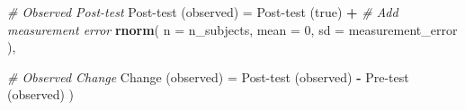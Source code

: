 \documentclass[
]{book}
\newenvironment{Shaded}{\begin{snugshade}}{\end{snugshade}}
\newcommand{\CommentTok}[1]{\textcolor[rgb]{0.56,0.35,0.01}{\textit{#1}}}
\newcommand{\DataTypeTok}[1]{\textcolor[rgb]{0.13,0.29,0.53}{#1}}
\newcommand{\DecValTok}[1]{\textcolor[rgb]{0.00,0.00,0.81}{#1}}
\newcommand{\KeywordTok}[1]{\textcolor[rgb]{0.13,0.29,0.53}{\textbf{#1}}}
\newcommand{\NormalTok}[1]{#1}
\newcommand{\OperatorTok}[1]{\textcolor[rgb]{0.81,0.36,0.00}{\textbf{#1}}}
\newcommand{\StringTok}[1]{\textcolor[rgb]{0.31,0.60,0.02}{#1}}
\begin{document}
\begin{Shaded}
\begin{Highlighting}[]
  \CommentTok{\# Observed Post{-}test}
  \StringTok{\textasciigrave{}}\DataTypeTok{Post{-}test (observed)}\StringTok{\textasciigrave{}}\NormalTok{ =}\StringTok{ \textasciigrave{}}\DataTypeTok{Post{-}test (true)}\StringTok{\textasciigrave{}} \OperatorTok{+}
\StringTok{    }\CommentTok{\# Add measurement error}
\StringTok{    }\KeywordTok{rnorm}\NormalTok{(}
      \DataTypeTok{n =}\NormalTok{ n\_subjects,}
      \DataTypeTok{mean =} \DecValTok{0}\NormalTok{,}
      \DataTypeTok{sd =}\NormalTok{ measurement\_error}
\NormalTok{    ),}

  \CommentTok{\# Observed Change}
  \StringTok{\textasciigrave{}}\DataTypeTok{Change (observed)}\StringTok{\textasciigrave{}}\NormalTok{ =}\StringTok{ \textasciigrave{}}\DataTypeTok{Post{-}test (observed)}\StringTok{\textasciigrave{}} \OperatorTok{{-}}\StringTok{ \textasciigrave{}}\DataTypeTok{Pre{-}test (observed)}\StringTok{\textasciigrave{}}
\NormalTok{)}


\end{Highlighting}
\end{Shaded}
\end{document}
